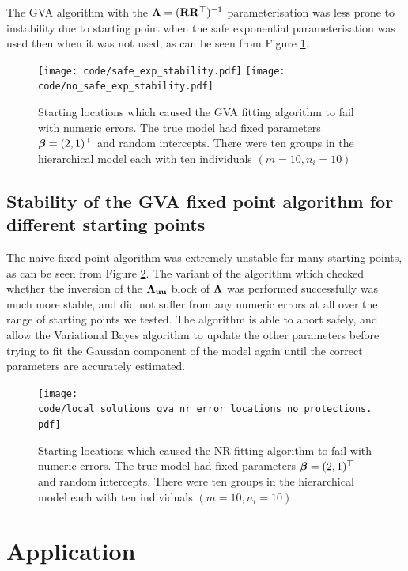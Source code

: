 			The GVA algorithm with the ${\boldsymbol \Lambda} = ({\bf R} {\bf R}^\top)^{-1}$ parameterisation was less prone to
			instability due to starting point when the safe exponential parameterisation was used then when it was
			not used, as can be seen from Figure \ref{fig:stability_locations_gva}. %
					
			\begin{figure}
				\texttt{[image: code/safe\_exp\_stability.pdf]}
				\texttt{[image: code/no\_safe\_exp\_stability.pdf]}
				\label{fig:stability_locations_gva}
				\caption{Starting locations which caused the GVA fitting algorithm to fail with numeric errors. The true model had fixed parameters ${\boldsymbol \beta} = (2, 1)^\top$ and random intercepts. There were ten groups in the
					hierarchical model each	with ten individuals $(m=10, n_i=10)$}
			\end{figure}

			\subsection{Stability of the GVA fixed point algorithm for different starting points}

			The naive fixed point algorithm was extremely unstable for many starting points, as can be seen from
			Figure \ref{fig:stability_locations_nr}. The variant of the algorithm which checked whether the
			inversion of the ${\boldsymbol \Lambda}_{{\bf u} {\bf u}}$ block of ${\boldsymbol \Lambda}$ was performed successfully was much more
			stable, and did not suffer from any numeric errors at all over the range of starting points we tested.
			The algorithm is able to abort safely, and allow the Variational Bayes algorithm to update the other
			parameters before trying to fit the Gaussian component of the model again until the correct parameters
			are accurately estimated.

			\begin{figure}
				\texttt{[image: code/local\_solutions\_gva\_nr\_error\_locations\_no\_protections.pdf]}
				\label{fig:stability_locations_nr}
				\caption{Starting locations which caused the NR fitting algorithm to fail with numeric errors. The true model 						had fixed parameters ${\boldsymbol \beta} = (2, 1)^\top$ and random intercepts. There were ten groups in the
					hierarchical model each	with ten individuals $(m=10, n_i=10)$}
			\end{figure}
			
			\section{Application}
			\label{sec:application}
			
